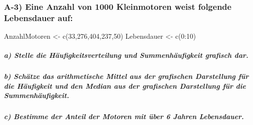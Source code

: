 \documentclass[
]{article}
\newenvironment{Shaded}{\begin{snugshade}}{\end{snugshade}}
\newcommand{\DecValTok}[1]{\textcolor[rgb]{0.00,0.00,0.81}{#1}}
\newcommand{\FunctionTok}[1]{\textcolor[rgb]{0.00,0.00,0.00}{#1}}
\newcommand{\NormalTok}[1]{#1}
\newcommand{\OtherTok}[1]{\textcolor[rgb]{0.56,0.35,0.01}{#1}}
\newcommand{\SpecialCharTok}[1]{\textcolor[rgb]{0.00,0.00,0.00}{#1}}
\begin{document}
\hypertarget{a-3-eine-anzahl-von-1000-kleinmotoren-weist-folgende-lebensdauer-auf}{%
\subsubsection{A-3) Eine Anzahl von 1000 Kleinmotoren weist folgende
Lebensdauer
auf:}\label{a-3-eine-anzahl-von-1000-kleinmotoren-weist-folgende-lebensdauer-auf}}

\begin{Shaded}
\begin{Highlighting}[]
\NormalTok{AnzahlMotoren }\OtherTok{\textless{}{-}} \FunctionTok{c}\NormalTok{(}\DecValTok{33}\NormalTok{,}\DecValTok{276}\NormalTok{,}\DecValTok{404}\NormalTok{,}\DecValTok{237}\NormalTok{,}\DecValTok{50}\NormalTok{)}
\NormalTok{Lebensdauer }\OtherTok{\textless{}{-}} \FunctionTok{c}\NormalTok{(}\DecValTok{0}\SpecialCharTok{:}\DecValTok{10}\NormalTok{)}
\end{Highlighting}
\end{Shaded}

\hypertarget{a-stelle-die-huxe4ufigkeitsverteilung-und-summenhuxe4ufigkeit-grafisch-dar.}{%
\subparagraph{\texorpdfstring{\textbf{a) Stelle die
Häufigkeitsverteilung und Summenhäufigkeit grafisch
dar.}}{a) Stelle die Häufigkeitsverteilung und Summenhäufigkeit grafisch dar.}}\label{a-stelle-die-huxe4ufigkeitsverteilung-und-summenhuxe4ufigkeit-grafisch-dar.}}

\hypertarget{b-schuxe4tze-das-arithmetische-mittel-aus-der-grafischen-darstellung-fuxfcr-die-huxe4ufigkeit-und-den-median-aus-der-grafischen-darstellung-fuxfcr-die-summenhuxe4ufigkeit.}{%
\subparagraph{\texorpdfstring{\textbf{b) Schätze das arithmetische
Mittel aus der grafischen Darstellung für die Häufigkeit und den Median
aus der grafischen Darstellung für die
Summenhäufigkeit.}}{b) Schätze das arithmetische Mittel aus der grafischen Darstellung für die Häufigkeit und den Median aus der grafischen Darstellung für die Summenhäufigkeit.}}\label{b-schuxe4tze-das-arithmetische-mittel-aus-der-grafischen-darstellung-fuxfcr-die-huxe4ufigkeit-und-den-median-aus-der-grafischen-darstellung-fuxfcr-die-summenhuxe4ufigkeit.}}

\hypertarget{c-bestimme-der-anteil-der-motoren-mit-uxfcber-6-jahren-lebensdauer.}{%
\subparagraph{\texorpdfstring{\textbf{c) Bestimme der Anteil der Motoren
mit über 6 Jahren
Lebensdauer.}}{c) Bestimme der Anteil der Motoren mit über 6 Jahren Lebensdauer.}}\label{c-bestimme-der-anteil-der-motoren-mit-uxfcber-6-jahren-lebensdauer.}}
\end{document}
